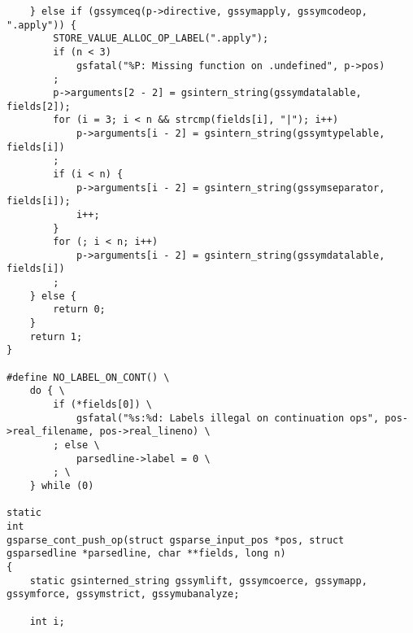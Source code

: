\documentclass{report}
\begin{document}
\begin{verbatim}
    } else if (gssymceq(p->directive, gssymapply, gssymcodeop, ".apply")) {
        STORE_VALUE_ALLOC_OP_LABEL(".apply");
        if (n < 3)
            gsfatal("%P: Missing function on .undefined", p->pos)
        ;
        p->arguments[2 - 2] = gsintern_string(gssymdatalable, fields[2]);
        for (i = 3; i < n && strcmp(fields[i], "|"); i++)
            p->arguments[i - 2] = gsintern_string(gssymtypelable, fields[i])
        ;
        if (i < n) {
            p->arguments[i - 2] = gsintern_string(gssymseparator, fields[i]);
            i++;
        }
        for (; i < n; i++)
            p->arguments[i - 2] = gsintern_string(gssymdatalable, fields[i])
        ;
    } else {
        return 0;
    }
    return 1;
}

#define NO_LABEL_ON_CONT() \
    do { \
        if (*fields[0]) \
            gsfatal("%s:%d: Labels illegal on continuation ops", pos->real_filename, pos->real_lineno) \
        ; else \
            parsedline->label = 0 \
        ; \
    } while (0)

static
int
gsparse_cont_push_op(struct gsparse_input_pos *pos, struct gsparsedline *parsedline, char **fields, long n)
{
    static gsinterned_string gssymlift, gssymcoerce, gssymapp, gssymforce, gssymstrict, gssymubanalyze;

    int i;


\end{verbatim}
\end{document}
